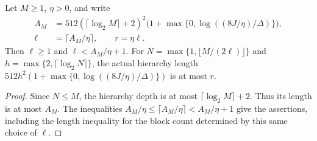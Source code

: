 \begin{lemma}
    \label{thm:hastings_periodic_chosen_radius}
    \leanok
    Let $M\ge1$, $\eta>0$, and write
    \begin{align*}
        A_M  & =512(\lceil\log_2 M\rceil+2)^2
        \bigl(1+\max\{0,\log((8J/\eta)/\Delta)\}\bigr),  \\
        \ell & =\lceil A_M/\eta\rceil,\qquad r=\eta\ell.
    \end{align*}
    Then $\ell\ge1$ and $\ell<A_M/\eta+1$.
    For $N=\max\{1,\lfloor M/(2\ell)\rfloor\}$ and
    $h=\max\{2,\lceil\log_2N\rceil\}$, the actual hierarchy length
    $512h^2(1+\max\{0,\log((8J/\eta)/\Delta)\})$ is at most $r$.
\end{lemma}
\begin{proof}\leanok
    Since $N\le M$, the hierarchy depth is at most
    $\lceil\log_2M\rceil+2$. Thus its length is at most $A_M$.
    The inequalities $A_M/\eta\le\lceil A_M/\eta\rceil<A_M/\eta+1$
    give the assertions, including the length inequality for the block
    count determined by this same choice of $\ell$.
\end{proof}

